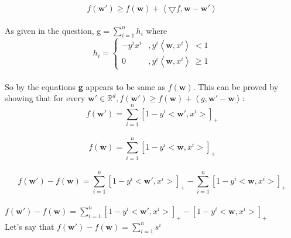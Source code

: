 \documentclass[a4paper,11pt]{article}
\begin{document}
\begin{mlsolution}
\[
f\left ( \textbf{w}{}' \right ) \geq f\left ( \textbf{w}{} \right ) + \left \langle \bigtriangledown f, \textbf{w} - \textbf{w}{}' \right \rangle
\]\\

As given in the question, 
g\begin{math} = \sum_{i=1}^{n}h_{i} \end{math} where  \\

\[
h_{i} = \left\{
\begin{matrix}
-y^{i}x^{i} &,  y^{i} \left \langle \textbf{w}, x^{i} \right \rangle \;<  1\\ 
0 & , y^{i} \left \langle \textbf{w}, x^{i} \right \rangle \;\geq  1
\end{matrix}\right.
\]\\

So by the equations \textbf{g} appears to be same as \begin{math}f\left ( \textbf{w} \right ).\end{math} This can be proved by showing that for every \begin{math}\textbf{w}{}' \in \mathbb{R}^{d}, f\left ( \textbf{w}{}' \right ) \geq f\left ( \textbf{w} \right ) + \left \langle g, \textbf{w}{}' - \textbf{w} \right \rangle:\end{math}\\

\[
f\left ( \textbf{w}{}' \right ) = \sum_{i=1}^{n} \left [  1 - y^{i}<\textbf{w}{}', x^{i}> \right ]_{+} \]\\

\[f\left ( \textbf{w} \right ) = \sum_{i=1}^{n} \left [  1 - y^{i}<\textbf{w}, x^{i}> \right ]_{+}
\]\\

\[
f\left ( \textbf{w}{}' \right ) - f\left ( \textbf{w} \right ) = \sum_{i=1}^{n} \left [  1 - y^{i}<\textbf{w}{}', x^{i}> \right ]_{+} - \sum_{i=1}^{n} \left [  1 - y^{i}<\textbf{w}, x^{i}> \right ]_{+}
\]\\

\begin{math}
f\left ( \textbf{w}{}' \right ) - f\left ( \textbf{w} \right ) = \sum_{i=1}^{n} \left [  1 - y^{i}<\textbf{w}{}', x^{i}> \right ]_{+} - \left [  1 - y^{i}<\textbf{w}, x^{i}> \right ]_{+}
\end{math}\\

Let's say that 
\begin{math}
f\left ( \textbf{w}{}' \right ) - f\left ( \textbf{w} \right ) = \sum_{i=1}^{n} s^{i}
\end{math}\\


\end{mlsolution}
\end{document}
